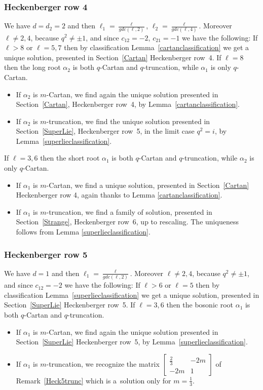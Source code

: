 \documentclass[10pt,a4paper]{amsart}
\numberwithin{equation}{section}
\begin{document}
\subsubsection*{Heckenberger row 4}
We have $d=d_2=2$ and then $\ell_1 = \frac{\ell}{gdc(\ell,2)}$, $\ell_2 = \frac{\ell}{gdc(\ell,4)}$. Moreover $\ell \neq 2,4$, because $q^2 \neq \pm 1$, and since $c_{12}=-2$, $c_{21}=-1$ we have the following:
If $\ell > 8$ or $\ell=5,7$ then by classification Lemma~\ref{cartanclassification} we get a unique solution, presented in Section~\ref{Cartan} Heckenberger row~4.
If $\ell = 8$ then the long root $\alpha_2$ is both $q$-Cartan and $q$-truncation, while $\alpha_1$ is only $q$-Cartan.
\begin{itemize}\itemsep=0pt
	\item If $\alpha_2$ is $m$-Cartan, we find again the unique solution presented in Section~\ref{Cartan}, Heckenberger row~4, by Lemma~\ref{cartanclassification}.
	\item If $\alpha_2$ is $m$-truncation, we find the unique solution presented in Section~\ref{SuperLie}, Heckenberger row~5, in the limit case $q^2=i$, by Lemma~\ref{superlieclassification}.
	
\end{itemize}
If $\ell = 3,6$ then the short root $\alpha_1$ is both $q$-Cartan and $q$-truncation, while $\alpha_2$ is only $q$-Cartan.
\begin{itemize}\itemsep=0pt
	\item If $\alpha_1$ is $m$-Cartan, we find a unique solution, presented in Section~\ref{Cartan} Heckenberger row 4, again thanks to Lemma \ref{cartanclassification}.
	\item If $\alpha_1$ is $m$-truncation, we find a family of solution, presented in Section~\ref{Strange}, Heckenberger row~6, up to rescaling. The uniqueness follows from Lemma \ref{superlieclassification}.
\end{itemize}
\subsubsection*{Heckenberger row 5} We have $d=1$ and then $\ell_1 = \frac{\ell}{gdc(\ell,2)}$. Moreover $\ell \neq 2,4$, because $q^2 \neq \pm 1$, and since $c_{12}=-2$ we have the following: If $\ell > 6 $ or $\ell = 5$ then by classification Lemma~\ref{superlieclassification} we get a unique solution, presented in Section~\ref{SuperLie} Heckenberger row~5.
If $\ell = 3, 6$ then the bosonic root $\alpha_1$ is both $q$-Cartan and $q$-truncation.
\begin{itemize}\itemsep=0pt
	\item If $\alpha_1$ is $m$-Cartan, we find again the unique solution presented in Section~\ref{SuperLie} Heckenberger row~5, by Lemma~\ref{superlieclassification}.
	\item If $\alpha_1$ is $m$-truncation, we recognize the matrix $\left[\begin{smallmatrix}
 \frac{2}{3} & -2m\\
 -2m & 1
\end{smallmatrix} \right]$
of Remark~\ref{Heck5trunc} which is a~solution only for $m=\frac{1}{3}$.
\end{itemize}
\end{document}

